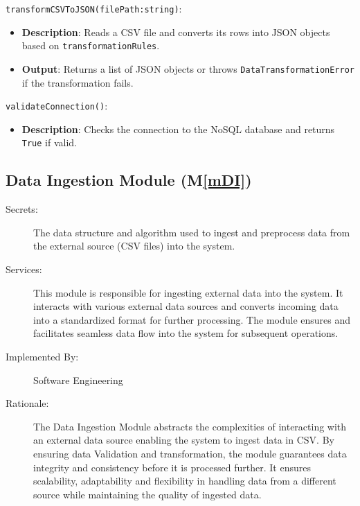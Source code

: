 \documentclass[12pt, titlepage]{article}
\newcommand{\mref}[1]{M\ref{#1}}
\begin{document}
\begin{description}
  \item[Local Function:] 
  \item
\texttt{transformCSVToJSON(filePath:string)}:
  \item
  \begin{itemize}
    \item \textbf{Description}: Reads a CSV file and converts its rows into JSON objects based on
    \texttt{transformationRules}.
  \end{itemize}
  \item 
  \begin{itemize}
    \item \textbf{Output}: Returns a list of JSON objects or throws \texttt{DataTransformationError}
    if the transformation fails.
  \end{itemize}
  \item 
  \texttt{validateConnection()}:
  \item 
  \begin{itemize}
    \item \textbf{Description}: Checks the connection to the NoSQL database and returns \texttt{True}
    if valid.
  \end{itemize}
\end{description}

\subsection{Data Ingestion Module (\mref{mDI})} \label{mIngestion}
\begin{description}
  \item[Secrets:] The data structure and algorithm used to ingest and preprocess data from
  the external source (CSV files) into the system.
  \item[Services:] This module is responsible for ingesting external data into the system.
  It interacts with various external data sources and converts incoming data into a 
  standardized format for further processing. The module ensures and facilitates seamless
  data flow into the system for subsequent operations.
  \item[Implemented By:] Software Engineering
  \item[Rationale:] The Data Ingestion Module abstracts the complexities of interacting with
  an external data source enabling the system to ingest data in CSV. By ensuring data Validation
  and transformation, the module guarantees data integrity and consistency before it is processed
  further. It ensures scalability, adaptability and flexibility in handling data from a different
  source while maintaining the quality of ingested data.
\end{description}
\end{document}

